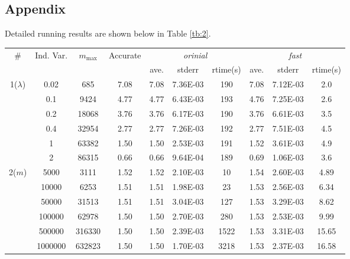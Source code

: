 \documentclass{scrartcl}
\begin{document}
\subsection*{Appendix} %
\label{sub:appendix}
Detailed running results are shown below in Table \ref{tb:2}.
\begin{table}[h]
\centering
\begin{tabularx}{\textwidth}{c|c|c|c|ccc|ccc}
\toprule
\# & Ind. Var. & $m_{\max} $ & Accurate & \multicolumn{3}{c}{\emph{orinial}} & \multicolumn{3}{c}{\emph{fast}} \\
 &  &  &  & ave. & stderr & rtime(s) & ave. & stderr & rtime(s) \\
\midrule
1($\lambda$) & 0.02 & 685 & 7.08 & 7.08& 7.36E-03 & 190 & 7.08 & 7.12E-03 & 2.0 \\
 & 0.1 & 9424 & 4.77 & 4.77 & 6.43E-03 & 193 & 4.76 & 7.25E-03 & 2.6 \\
 & 0.2 & 18068 & 3.76 & 3.76 & 6.17E-03 & 190 & 3.76 & 6.61E-03 & 3.5 \\
 & 0.4 & 32954 & 2.77 & 2.77 & 7.26E-03 & 192 & 2.77 & 7.51E-03 & 4.5 \\
 & 1 & 63382 & 1.50 & 1.50 & 2.53E-03 & 191 & 1.52 & 3.61E-03 & 4.9 \\
 & 2 & 86315 & 0.66 & 0.66 & 9.64E-04 & 189 & 0.69 & 1.06E-03 & 3.6 \\
\midrule
2($m$) & 5000 & 3111 & 1.52 & 1.52 & 2.10E-03 & 10 & 1.54 & 2.60E-03 & 4.89\\
 & 10000 & 6253 & 1.51 & 1.51 & 1.98E-03 & 23 & 1.53 & 2.56E-03 & 6.34\\
 & 50000 & 31513 & 1.51 & 1.51 & 3.04E-03 & 127 & 1.53 & 3.29E-03 & 8.62\\
 & 100000 & 62978 & 1.50 & 1.50 & 2.70E-03 & 280 & 1.53 & 2.53E-03 & 9.99\\
&500000 & 316330 & 1.50 & 1.50 & 2.39E-03 & 1522 & 1.53 & 3.31E-03 & 15.65 \\
&1000000 & 632823 & 1.50 & 1.50 & 1.70E-03 & 3218 & 1.53 & 2.37E-03 & 16.58 \\


\end{tabularx}
\end{table}
\end{document}
